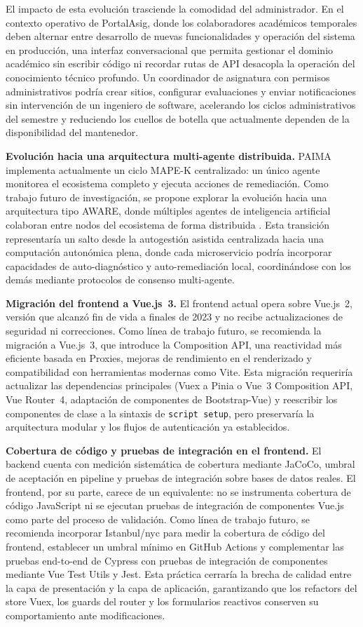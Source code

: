 El impacto de esta evolución trasciende la comodidad del administrador. En el
contexto operativo de PortalAsig, donde los colaboradores académicos temporales
deben alternar entre desarrollo de nuevas funcionalidades y operación del sistema
en producción, una interfaz conversacional que permita gestionar el dominio
académico sin escribir código ni recordar rutas de API desacopla la operación del
conocimiento técnico profundo. Un coordinador de asignatura con permisos
administrativos podría crear sitios, configurar evaluaciones y enviar
notificaciones sin intervención de un ingeniero de software, acelerando los
ciclos administrativos del semestre y reduciendo los cuellos de botella que
actualmente dependen de la disponibilidad del mantenedor.

\textbf{Evolución hacia una arquitectura multi-agente distribuida.} PAIMA
implementa actualmente un ciclo MAPE-K centralizado: un único agente monitorea
el ecosistema completo y ejecuta acciones de remediación. Como trabajo futuro de
investigación, se propone explorar la evolución hacia una arquitectura tipo AWARE,
donde múltiples agentes de inteligencia artificial colaboran entre nodos del
ecosistema de forma distribuida \cite{sanwouo2025aware}. Esta transición
representaría un salto desde la autogestión asistida centralizada hacia una
computación autonómica plena, donde cada microservicio podría incorporar
capacidades de auto-diagnóstico y auto-remediación local, coordinándose con los
demás mediante protocolos de consenso multi-agente.

\textbf{Migración del frontend a Vue.js~3.} El frontend actual opera sobre
Vue.js~2, versión que alcanzó fin de vida a finales de 2023 y no recibe
actualizaciones de seguridad ni correcciones. Como línea de trabajo futuro, se
recomienda la migración a Vue.js~3, que introduce la Composition API, una
reactividad más eficiente basada en Proxies, mejoras de rendimiento en el
renderizado y compatibilidad con herramientas modernas como Vite. Esta
migración requeriría actualizar las dependencias principales (Vuex a Pinia o
Vue~3 Composition API, Vue Router~4, adaptación de componentes de
Bootstrap-Vue) y reescribir los componentes de clase a la sintaxis de
\texttt{script setup}, pero preservaría la arquitectura modular y los flujos de
autenticación ya establecidos.

\textbf{Cobertura de código y pruebas de integración en el frontend.} El
backend cuenta con medición sistemática de cobertura mediante JaCoCo, umbral
de aceptación en pipeline y pruebas de integración sobre bases de datos reales.
El frontend, por su parte, carece de un equivalente: no se instrumenta cobertura
de código JavaScript ni se ejecutan pruebas de integración de componentes Vue.js
como parte del proceso de validación. Como línea de trabajo futuro, se
recomienda incorporar Istanbul/nyc para medir la cobertura de código del
frontend, establecer un umbral mínimo en GitHub Actions y complementar las
pruebas end-to-end de Cypress con pruebas de integración de componentes
mediante Vue Test Utils y Jest. Esta práctica cerraría la brecha de calidad
entre la capa de presentación y la capa de aplicación, garantizando que los
refactors del store Vuex, los guards del router y los formularios reactivos
conserven su comportamiento ante modificaciones.

